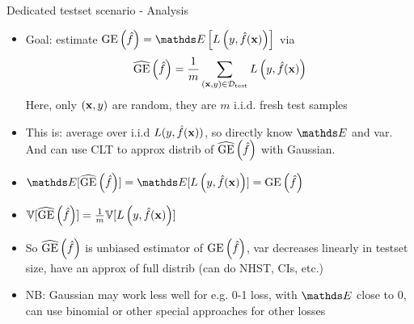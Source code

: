 \documentclass[11pt,compress,t,notes=noshow, xcolor=table]{beamer}
\begin{document}
\begin{frame}{Dedicated testset scenario - Analysis}
\begin{itemize}
\item Goal: estimate $\GEf = \E \left[\Lyfhx \right]$ via
$$\widehat{\mathrm{GE}}\left(\hat{f}\right) = \frac{1}{m} \sum_{(\mathbf{x}, y) \in \mathcal{D}_{\text{test}}} L\left(y, \hat{f}(\mathbf{x})\right) $$
Here, only $(\mathbf{x},y)$ are random, they are $m$ i.i.d. fresh test samples


\item This is: average over i.i.d $L(y, \hat{f}(\mathbf{x}))$,
    so directly know $\E$ and var. And can use CLT to approx distrib of $\widehat{\mathrm{GE}}\left(\hat{f}\right)$ with Gaussian.

\item $\E[\GEfh] = \E[\Lyfhx] = \GEf $

\item $\mathbb{V}[\widehat{\mathrm{GE}}\left(\hat{f}\right)] = \frac{1}{m} \mathbb{V}[L\left(y, \hat{f}(\mathbf{x})\right)]$ 

\item So $\widehat{\mathrm{GE}}\left(\hat{f}\right)$ is unbiased estimator of $\mathrm{GE}\left(\hat{f}\right)$, var decreases linearly in testset size, have an approx of full distrib (can do NHST, CIs, etc.)
\item NB: Gaussian may work less well for e.g. 0-1 loss, with $\E$ close to 0, can use binomial or other special approaches for other losses

\end{itemize}
\end{frame}
\end{document}
